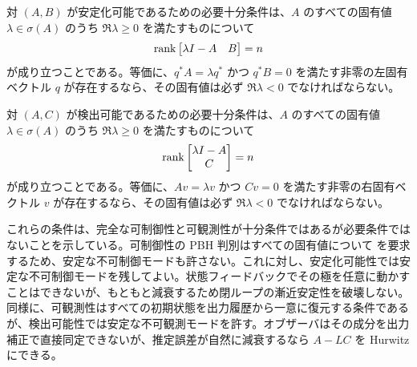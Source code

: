 \begin{theorem}
対 $(A,B)$ が安定化可能であるための必要十分条件は、$A$ のすべての固有値 $\lambda\in\sigma(A)$ のうち $\Re\lambda\ge0$ を満たすものについて
\begin{equation}
  \operatorname{rank}\begin{bmatrix}\lambda I-A&B\end{bmatrix}=n
  \label{eq:pbh-stabilizability}
\end{equation}
が成り立つことである。等価に、$q^\ast A=\lambda q^\ast$ かつ $q^\ast B=0$ を満たす非零の左固有ベクトル $q$ が存在するなら、その固有値は必ず $\Re\lambda<0$ でなければならない。
\end{theorem}

\begin{theorem}
対 $(A,C)$ が検出可能であるための必要十分条件は、$A$ のすべての固有値 $\lambda\in\sigma(A)$ のうち $\Re\lambda\ge0$ を満たすものについて
\begin{equation}
  \operatorname{rank}\begin{bmatrix}\lambda I-A\\ C\end{bmatrix}=n
  \label{eq:pbh-detectability}
\end{equation}
が成り立つことである。等価に、$Av=\lambda v$ かつ $Cv=0$ を満たす非零の右固有ベクトル $v$ が存在するなら、その固有値は必ず $\Re\lambda<0$ でなければならない。
\end{theorem}

これらの条件は、完全な可制御性と可観測性が十分条件ではあるが必要条件ではないことを示している。可制御性の PBH 判別はすべての固有値について  を要求するため、安定な不可制御モードも許さない。これに対し、安定化可能性では安定な不可制御モードを残してよい。状態フィードバックでその極を任意に動かすことはできないが、もともと減衰するため閉ループの漸近安定性を破壊しない。同様に、可観測性はすべての初期状態を出力履歴から一意に復元する条件であるが、検出可能性では安定な不可観測モードを許す。オブザーバはその成分を出力補正で直接同定できないが、推定誤差が自然に減衰するなら $A-LC$ を Hurwitz にできる。

